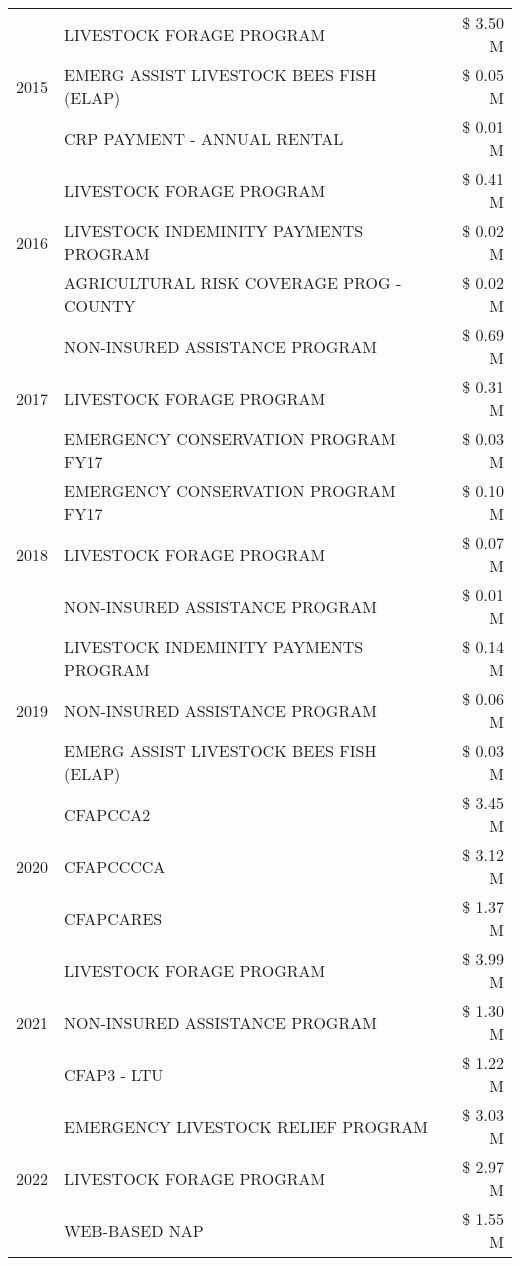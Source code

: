 \begin{tabular}{llr}
\cline{1-3}
\multirow[t]{3}{*}{2015} & LIVESTOCK FORAGE PROGRAM & \$ 3.50 M \\
 & EMERG ASSIST LIVESTOCK BEES FISH (ELAP) & \$ 0.05 M \\
 & CRP PAYMENT - ANNUAL RENTAL & \$ 0.01 M \\
\cline{1-3}
\multirow[t]{3}{*}{2016} & LIVESTOCK FORAGE PROGRAM & \$ 0.41 M \\
 & LIVESTOCK INDEMINITY PAYMENTS PROGRAM & \$ 0.02 M \\
 & AGRICULTURAL RISK COVERAGE PROG - COUNTY & \$ 0.02 M \\
\cline{1-3}
\multirow[t]{3}{*}{2017} & NON-INSURED ASSISTANCE PROGRAM & \$ 0.69 M \\
 & LIVESTOCK FORAGE PROGRAM & \$ 0.31 M \\
 & EMERGENCY CONSERVATION PROGRAM FY17 & \$ 0.03 M \\
\cline{1-3}
\multirow[t]{3}{*}{2018} & EMERGENCY CONSERVATION PROGRAM FY17 & \$ 0.10 M \\
 & LIVESTOCK FORAGE PROGRAM & \$ 0.07 M \\
 & NON-INSURED ASSISTANCE PROGRAM & \$ 0.01 M \\
\cline{1-3}
\multirow[t]{3}{*}{2019} & LIVESTOCK INDEMINITY PAYMENTS PROGRAM & \$ 0.14 M \\
 & NON-INSURED ASSISTANCE PROGRAM & \$ 0.06 M \\
 & EMERG ASSIST LIVESTOCK BEES FISH (ELAP) & \$ 0.03 M \\
\cline{1-3}
\multirow[t]{3}{*}{2020} & CFAPCCA2 & \$ 3.45 M \\
 & CFAPCCCCA & \$ 3.12 M \\
 & CFAPCARES & \$ 1.37 M \\
\cline{1-3}
\multirow[t]{3}{*}{2021} & LIVESTOCK FORAGE PROGRAM & \$ 3.99 M \\
 & NON-INSURED ASSISTANCE PROGRAM & \$ 1.30 M \\
 & CFAP3 - LTU & \$ 1.22 M \\
\cline{1-3}
\multirow[t]{3}{*}{2022} & EMERGENCY LIVESTOCK RELIEF PROGRAM & \$ 3.03 M \\
 & LIVESTOCK FORAGE PROGRAM & \$ 2.97 M \\
 & WEB-BASED NAP & \$ 1.55 M \\
\cline{1-3}
\bottomrule
\end{tabular}
